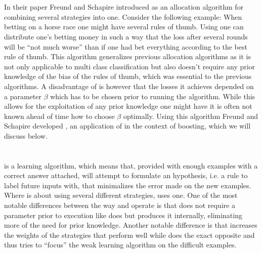 \newpage \section{\hedge}
In their paper Freund and Schapire introduced \hedge as an allocation algorithm for combining several strategies into one. Consider the following example: When betting on a horse race one might have several rules of thumb. Using \hedge one can distribute one's betting money in such a way that the loss after several rounds will be ``not much worse'' than if one had bet everything according to the best rule of thumb. This algorithm generalizes previous allocation algorithms as it is not only applicable to multi class classification but also doesn't require any prior knowledge of the bias of the rules of thumb, which was essential to the previous algorithms. A disadvantage of \hedge is however that the losses it achieves depended on a parameter $\beta$ which has to be chosen prior to running the algorithm. While this allows for the exploitation of any prior knowledge one might have it is often not known ahead of time how to choose $\beta$ optimally. Using this \hedge algorithm Freund and Schapire developed \adaB, an application of \hedge in the context of boosting, which we will discuss below. 

\section{\adaB}
\adaB is a learning algorithm, which means that, provided with enough examples with a correct answer attached, \adaB will attempt to formulate an hypothesis, i.e. a rule to label future inputs with, that minimalizes the error made on the new examples. Where \hedge is about using several different strategies, \adaB uses one. One of the most notable differences between the way \hedge and \adaB operate is that \adaB does not require a parameter prior to execution like \hedge does but produces it internally, eliminating more of the need for prior knowledge. Another notable difference is that \hedge increases the weights of the strategies that perform well while \adaB does the exact opposite and thus tries to ``focus'' the weak learning algorithm on the difficult examples. 
